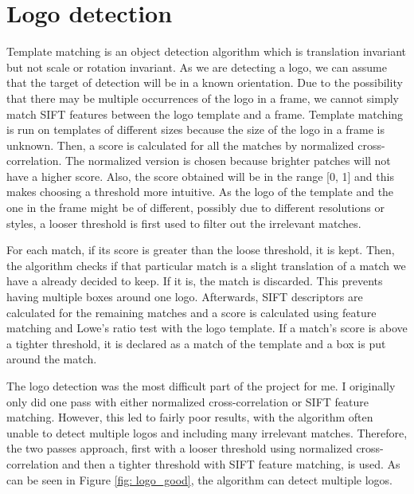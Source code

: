 \documentclass{article}
\begin{document}
\section{Logo detection}
Template matching is an object detection algorithm which is translation invariant but not scale or rotation invariant. As we are detecting a logo, we can assume that the target of detection will be in a known orientation. Due to the possibility that there may be multiple occurrences of the logo in a frame, we cannot simply match SIFT features between the logo template and a frame. Template matching is run on templates of different sizes because the size of the logo in a frame is unknown. Then, a score is calculated for all the matches by normalized cross-correlation. The normalized version is chosen because brighter patches will not have a higher score. Also, the score obtained will be in the range [0, 1] and this makes choosing a threshold more intuitive. As the logo of the template and the one in the frame might be of different, possibly due to different resolutions or styles, a looser threshold is first used to filter out the irrelevant matches. 

For each match, if its score is greater than the loose threshold, it is kept. Then, the algorithm checks if that particular match is a slight translation of a match we have a already decided to keep. If it is, the match is discarded. This prevents having multiple boxes around one logo. Afterwards, SIFT descriptors are calculated for the remaining matches and a score is calculated using feature matching and Lowe's ratio test with the logo template. If a match's score is above a tighter threshold, it is declared as a match of the template and a box is put around the match.

The logo detection was the most difficult part of the project for me. I originally only did one pass with either normalized cross-correlation or SIFT feature matching. However, this led to fairly poor results, with the algorithm often unable to detect multiple logos and including many irrelevant matches. Therefore, the two passes approach, first with a looser threshold using normalized cross-correlation and then a tighter threshold with SIFT feature matching, is used. As can be seen in Figure \ref{fig: logo_good}, the algorithm can detect multiple logos.
\end{document}
